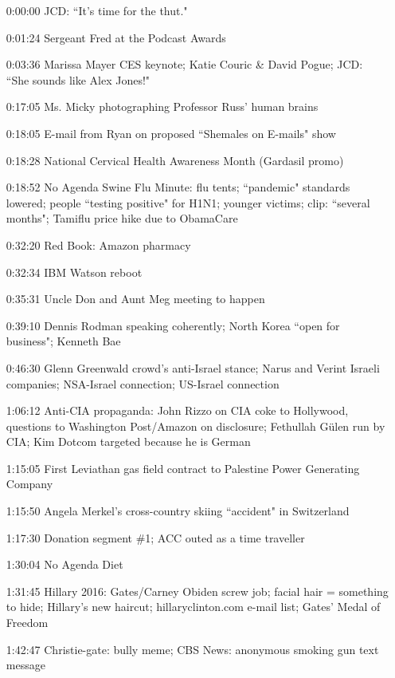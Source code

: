 \documentclass{report}
\newcommand{\mono}[1]{{\fontspec{Courier}#1}}
\begin{document}
\begin{itemize}
\item[\mono{0:00:00}] JCD: ``It's time for the thut."
\item[\mono{0:01:24}] Sergeant Fred at the Podcast Awards
\item[\mono{0:03:36}] Marissa Mayer CES keynote; Katie Couric \& David Pogue; JCD: ``She sounds like Alex Jones!"
\item[\mono{0:17:05}] Ms. Micky photographing Professor Russ' human brains
\item[\mono{0:18:05}] E-mail from Ryan on proposed ``Shemales on E-mails" show
\item[\mono{0:18:28}] National Cervical Health Awareness Month (Gardasil promo)
\item[\mono{0:18:52}] No Agenda Swine Flu Minute: flu tents; ``pandemic" standards lowered; people ``testing positive" for H1N1; younger victims; clip: ``several months"; Tamiflu price hike due to ObamaCare
\item[\mono{0:32:20}] Red Book: Amazon pharmacy
\item[\mono{0:32:34}] IBM Watson reboot
\item[\mono{0:35:31}] Uncle Don and Aunt Meg meeting to happen
\item[\mono{0:39:10}] Dennis Rodman speaking coherently; North Korea ``open for business"; Kenneth Bae
\item[\mono{0:46:30}] Glenn Greenwald crowd's anti-Israel stance; Narus and Verint Israeli companies; NSA-Israel connection; US-Israel connection
\item[\mono{1:06:12}] Anti-CIA propaganda: John Rizzo on CIA coke to Hollywood, questions to Washington Post/Amazon on disclosure; Fethullah Gülen run by CIA; Kim Dotcom targeted because he is German
\item[\mono{1:15:05}] First Leviathan gas field contract to Palestine Power Generating Company
\item[\mono{1:15:50}] Angela Merkel's cross-country skiing ``accident" in Switzerland
\item[\mono{1:17:30}] Donation segment \#1; ACC outed as a time traveller
\item[\mono{1:30:04}] No Agenda Diet
\item[\mono{1:31:45}] Hillary 2016: Gates/Carney Obiden screw job; facial hair = something to hide; Hillary's new haircut; hillaryclinton.com e-mail list; Gates' Medal of Freedom
\item[\mono{1:42:47}] Christie-gate: bully meme; CBS News: anonymous smoking gun text message

\end{itemize}
\end{document}
